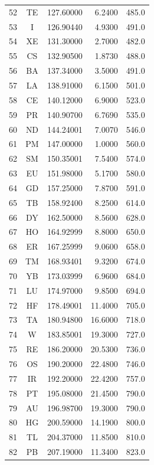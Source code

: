 \begin{longtable}{|rcrrr|}
52 & TE     &127.60000 &  6.2400    &485.0 \\
53 & I      &126.90440 &  4.9300    &491.0 \\
54 & XE     &131.30000 &  2.7000    &482.0 \\
55 & CS     &132.90500 &  1.8730    &488.0 \\
56 & BA     &137.34000 &  3.5000    &491.0 \\
57 & LA     &138.91000 &  6.1500    &501.0 \\
58 & CE     &140.12000 &  6.9000    &523.0 \\
59 & PR     &140.90700 &  6.7690    &535.0 \\
60 & ND     &144.24001 &  7.0070    &546.0 \\
61 & PM     &147.00000 &  1.0000    &560.0 \\
62 & SM     &150.35001 &  7.5400    &574.0 \\
63 & EU     &151.98000 &  5.1700    &580.0 \\
64 & GD     &157.25000 &  7.8700    &591.0 \\
65 & TB     &158.92400 &  8.2500    &614.0 \\
66 & DY     &162.50000 &  8.5600    &628.0 \\
67 & HO     &164.92999 &  8.8000    &650.0 \\
68 & ER     &167.25999 &  9.0600    &658.0 \\
69 & TM     &168.93401 &  9.3200    &674.0 \\
70 & YB     &173.03999 &  6.9600    &684.0 \\
71 & LU     &174.97000 &  9.8500    &694.0 \\
72 & HF     &178.49001 & 11.4000    &705.0 \\
73 & TA     &180.94800 & 16.6000    &718.0 \\
74 & W      &183.85001 & 19.3000    &727.0 \\
75 & RE     &186.20000 & 20.5300    &736.0 \\
76 & OS     &190.20000 & 22.4800    &746.0 \\
77 & IR     &192.20000 & 22.4200    &757.0 \\
78 & PT     &195.08000 & 21.4500    &790.0 \\
79 & AU     &196.98700 & 19.3000    &790.0 \\
80 & HG     &200.59000 & 14.1900    &800.0 \\
81 & TL     &204.37000 & 11.8500    &810.0 \\
82 & PB     &207.19000 & 11.3400    &823.0 \\

\end{longtable}

